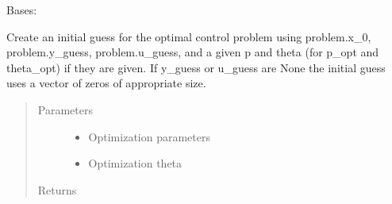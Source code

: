 \documentclass[letterpaper,10pt,english]{sphinxmanual}
\begin{document}
\begin{fulllineitems}
\label{\detokenize{yaocptool.methods.classic:yaocptool.methods.classic.multipleshooting.MultipleShootingScheme}}
Bases: {\hyperref[\detokenize{yaocptool.methods.base:yaocptool.methods.base.discretizationschemebase.DiscretizationSchemeBase}]{}}

\begin{fulllineitems}
\label{\detokenize{yaocptool.methods.classic:yaocptool.methods.classic.multipleshooting.MultipleShootingScheme.create_initial_guess}}
Create an initial guess for the optimal control problem using problem.x\_0, problem.y\_guess, problem.u\_guess,
and a given p and theta (for p\_opt and theta\_opt) if they are given.
If y\_guess or u\_guess are None the initial guess uses a vector of zeros of appropriate size.
\begin{quote}\begin{description}
\item[{Parameters}] \leavevmode\begin{itemize}
\item {} 
 \textendash{} Optimization parameters

\item {} 
 \textendash{} Optimization theta

\end{itemize}

\item[{Returns}] \leavevmode


\end{description}\end{quote}

\end{fulllineitems}



\end{fulllineitems}
\end{document}
